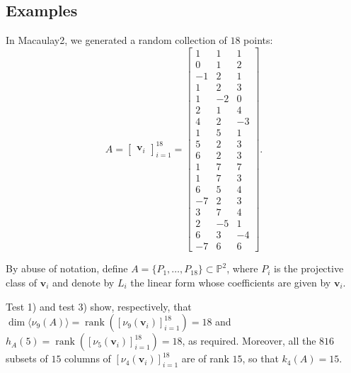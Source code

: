 \documentclass{amsart}
\newcommand{\Pj}{\mathbb{P}}
\newcommand{\vect}[1]{\mathbf{#1}}
\theoremstyle{definition}
\begin{document}
\subsection{Examples}\label{exok}
In Macaulay2, we generated a random collection of $ 18 $ points: 
\[ A =
\begin{bmatrix}
 \vect{v}_i
\end{bmatrix}_{i=1}^{18} = {
\begin{bmatrix}
1 & 1 & 1\\
0 & 1 & 2  \\
-1 & 2 & 1 \\
1 & 2 & 3 \\
1 & -2 & 0\\
2 & 1 & 4 \\
4 & 2 & -3 \\
1 & 5 & 1 \\
5 & 2 & 3 \\
6 & 2 & 3 \\
1 & 7 & 7 \\
1 & 7 & 3 \\
6 & 5 & 4 \\
-7 & 2 & 3 \\
3 & 7 & 4 \\
2 & -5 & 1 \\
6 & 3 & -4 \\
-7 & 6 & 6 
\end{bmatrix}.}
\]

By abuse of notation, define $ A=\{P_1,\dots,P_{18}\} \subset \Pj^{2} $, where $ P_i $ is the projective class of $\vect{v}_i$ and denote by $L_i$ the linear form whose coefficients are given by $\vect{v}_i$.

Test 1) and test 3) show, respectively, that $\dim \langle \nu_9(A) \rangle = \operatorname{rank}([\nu_{9}(\vect{v}_i)]_{i=1}^{18}) = 18$ and $ h_{A}(5)= \operatorname{rank}([\nu_{5}(\vect{v}_i)]_{i=1}^{18}) = 18 $, as required.  Moreover, all the $ 816 $ subsets of $ 15 $ columns of $ [\nu_{4}(\vect{v}_i)]_{i=1}^{18} $ are of rank $ 15 $, so that $ k_{4}(A) = 15 $.  

 \smallskip
 

 
\end{document}
